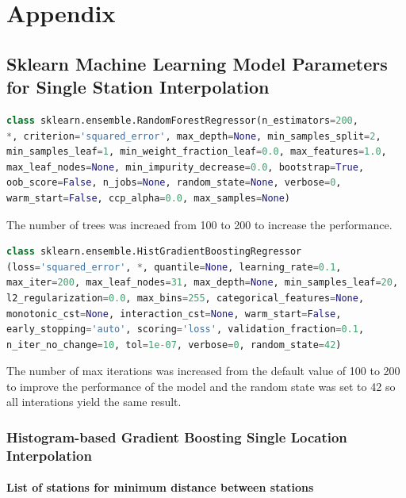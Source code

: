 \chapter{Appendix}


\section{Sklearn Machine Learning Model Parameters for Single Station Interpolation}
\label{appendix: sklearn ml parameters single station}

\begin{lstlisting}[language=Python, caption=Random Forest Regressor Parameters]
class sklearn.ensemble.RandomForestRegressor(n_estimators=200,
*, criterion='squared_error', max_depth=None, min_samples_split=2,
min_samples_leaf=1, min_weight_fraction_leaf=0.0, max_features=1.0,
max_leaf_nodes=None, min_impurity_decrease=0.0, bootstrap=True,
oob_score=False, n_jobs=None, random_state=None, verbose=0,
warm_start=False, ccp_alpha=0.0, max_samples=None)
\end{lstlisting}

The number of trees was increaed from 100 to 200 to increase the performance.

\begin{lstlisting}[language=Python, caption=Histogram-based Gradient Boosting Parameters]
class sklearn.ensemble.HistGradientBoostingRegressor
(loss='squared_error', *, quantile=None, learning_rate=0.1,
max_iter=200, max_leaf_nodes=31, max_depth=None, min_samples_leaf=20,
l2_regularization=0.0, max_bins=255, categorical_features=None,
monotonic_cst=None, interaction_cst=None, warm_start=False,
early_stopping='auto', scoring='loss', validation_fraction=0.1,
n_iter_no_change=10, tol=1e-07, verbose=0, random_state=42)
\end{lstlisting}

The number of max iterations was increased from the default value of 100 to 200 to improve the performance of the model and the random state was set to 42 so all interations yield the same result.

\subsection{Histogram-based Gradient Boosting Single Location Interpolation}

\subsubsection{List of stations for minimum distance between stations}
\label{appendix stations for minimum distance between stations}

